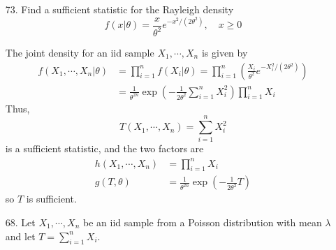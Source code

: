 \documentclass{article}
\begin{document}
\begin{itemize}
\begin{enumerate}[a.]
\begin{soln}
				\end{soln}
				
		\end{enumerate}

	\item[73.] Find a sufficient statistic for the Rayleigh density \[f(x|\theta)=\frac{x}{\theta^2}e^{-x^2/(2\theta^2)}, \quad x\ge 0\]
		\begin{soln}
			The joint density for an iid sample $X_1, \cdots, X_n$ is given by 
			\begin{align*}
				f(X_1, \cdots, X_n|\theta) &= \prod_{i=1}^n f(X_i|\theta) = \prod_{i=1}^n \left( \frac{X_i}{\theta^2} e^{-X_i^2/(2\theta^2)} \right) \\
					&= \frac{1}{\theta^{2n}}\exp{\left( -\frac{1}{2\theta^2}\sum_{i=1}^{n}X_i^2 \right)} \prod_{i=1}^n X_i 
			\end{align*}
			Thus, \[T(X_1, \cdots, X_n) = \sum_{i=1}^{n} X_i^2\] is a sufficient statistic, and the two factors are 
			\begin{align*}
				h(X_1, \cdots, X_n) &= \prod_{i=1}^n X_i \\
				g(T, \theta) &= \frac{1}{\theta^{2n}}\exp{\left( -\frac{1}{2\theta^2}T \right)}
			\end{align*} 
			so $T$ is sufficient.
			
		\end{soln}
		
	\item[68.] Let $X_1, \cdots, X_n$ be an iid sample from a Poisson distribution with mean $\lambda$ and let $T=\displaystyle \sum_{i=1}^{n} X_i.$


\end{itemize}
\end{document}
